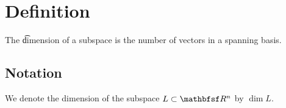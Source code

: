
\section*{Definition}

The \t{dimension} of a subspace is the number of vectors in a spanning basis.

\subsection*{Notation}

We denote the dimension of the subspace $L \subset \R ^n$ by $\dim L$.

\blankpage
